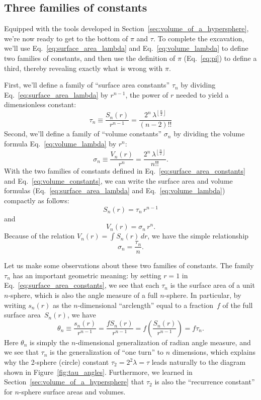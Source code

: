 


  \subsection{Three families of constants} %
  \label{sec:three_families_of_constants}

Equipped with the tools developed in Section~\ref{sec:volume_of_a_hypersphere}, we're now ready to get to the bottom of $\pi$ and $\tau$. To complete the excavation, we'll use Eq.~\eqref{eq:surface_area_lambda} and Eq.~\eqref{eq:volume_lambda} to define two families of constants, and then use the definition of $\pi$ (Eq.~\eqref{eq:pi}) to define a third, thereby revealing exactly what is wrong with $\pi$.

First, we'll define a family of ``surface area constants'' $\tau_n$ by dividing \linebreak Eq.~\eqref{eq:surface_area_lambda} by $r^{n-1}$, the power of $r$ needed to yield a dimensionless constant:
\begin{equation}
\label{eq:surface_area_constants}
\tau_n \equiv \frac{S_n(r)}{r^{n-1}} = \frac{2^n\,\lambda^{\left\lfloor \frac{n}{2} \right\rfloor}}{(n-2)!!}
\end{equation}
Second, we'll define a family of ``volume constants'' $\sigma_n$ by dividing the volume formula Eq.~\eqref{eq:volume_lambda} by $r^n$:
\begin{equation}
\label{eq:volume_constants}
\sigma_n \equiv \frac{V_n(r)}{r^n} = \frac{2^n\,\lambda^{\left\lfloor \frac{n}{2} \right\rfloor}}{n!!}.
\end{equation}
With the two families of constants defined in Eq.~\eqref{eq:surface_area_constants} and Eq.~\eqref{eq:volume_constants}, we can write the surface area and volume formulas (Eq.~\eqref{eq:surface_area_lambda} and Eq.~\eqref{eq:volume_lambda}) compactly as follows:
\[ S_n(r) = \tau_n\,r^{n-1} \]
and
\[ V_n(r) = \sigma_n\,r^n. \]
Because of the relation $V_n(r) = \int S_n(r)\,dr$, we have the simple relationship
\[
\sigma_n = \frac{\tau_n}{n}.
\]

Let us make some observations about these two families of constants. The family $\tau_n$ has an important geometric meaning: by setting $r=1$ in Eq.~\eqref{eq:surface_area_constants}, we see that each $\tau_n$ is the surface area of a unit $n$-sphere, which is also the angle measure of a full $n$-sphere. In particular, by writing $s_n(r)$ as the $n$-dimensional ``arclength'' equal to a fraction~$f$ of the full surface area~$S_n(r)$, we have
\[
\theta_n \equiv \frac{s_n(r)}{r^{n-1}} = \frac{f S_n(r)}{r^{n-1}} = f\left(\frac{S_n(r)}{r^{n-1}}\right) = f\tau_n.
\]
Here $\theta_n$ is simply the $n$-dimensional generalization of radian angle measure, and we see that $\tau_n$ is the generalization of ``one turn'' to $n$ dimensions, which explains why the 2-sphere (circle) constant $\tau_2 = 2^2\lambda = \tau$ leads naturally to the diagram shown in Figure~\ref{fig:tau_angles}. Furthermore, we learned in Section~\ref{sec:volume_of_a_hypersphere} that $\tau_2$ is also the ``recurrence constant'' for $n$-sphere surface areas and volumes.

